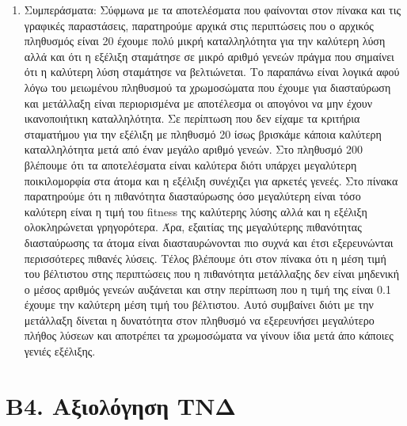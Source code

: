 \documentclass[12pt,a4paper]{article}
\newcommand{\tl}{\textlatin}
\begin{document}
\begin{enumerate}
\begin{figure}[H]
\begin{subfigure}[ht]{0.7\textwidth}
                         \caption*{Περίπτωση: 200, 0.1 ,0.01}
                     \end{subfigure}
                \end{figure} 
            \item Συμπεράσματα: 
                    Σύφμωνα με τα αποτελέσματα που φαίνονται στον πίνακα και τις γραφικές παραστάσεις, παρατηρούμε αρχικά
                    στις περιπτώσεις που ο αρχικός πληθυσμός είναι 20 έχουμε πολύ μικρή καταλληλότητα για την καλύτερη λύση αλλά και
                    ότι η εξέλιξη σταμάτησε σε μικρό αριθμό γενεών πράγμα που σημαίνει ότι η καλύτερη λύση σταμάτησε να βελτιώνεται.
                    Το παραπάνω είναι λογικά αφού λόγω του μειωμένου πληθυσμού τα χρωμοσώματα που έχουμε για διασταύρωση και 
                    μετάλλαξη είναι περιορισμένα με αποτέλεσμα οι απογόνοι να μην έχουν ικανοποιήτικη καταλληλότητα. Σε περίπτωση 
                    που δεν είχαμε τα κριτήρια σταματήμου για την εξέλιξη με πληθυσμό 20 ίσως βρισκάμε κάποια καλύτερη καταλληλότητα
                    μετά από έναν μεγάλο αριθμό γενεών. Στο πληθυσμό 200 βλέπουμε ότι τα αποτελέσματα είναι καλύτερα διότι υπάρχει 
                    μεγαλύτερη ποικιλομορφία στα άτομα και η εξέλιξη συνέχιζει για αρκετές γενεές.
                    Στο πίνακα παρατηρούμε ότι η πιθανότητα διασταύρωσης όσο μεγαλύτερη είναι τόσο καλύτερη είναι η τιμή του
                    \tl{fitness} της καλύτερης λύσης αλλά και η εξέλιξη ολοκληρώνεται γρηγορότερα. Άρα, εξαιτίας της μεγαλύτερης
                    πιθανότητας διασταύρωσης τα άτομα είναι διασταυρώνονται πιο συχνά και έτσι εξερευνώνται περισσότερες πιθανές 
                    λύσεις. Τέλος βλέπουμε ότι στον πίνακα ότι η μέση τιμή του βέλτιστου στης περιπτώσεις που η πιθανότητα
                    μετάλλαξης δεν είναι μηδενική ο μέσος αριθμός γενεών αυξάνεται και στην περίπτωση που η τιμή της είναι 0.1
                    έχουμε την καλύτερη μέση τιμή του βέλτιστου. Αυτό συμβαίνει διότι με την μετάλλαξη δίνεται η δυνατότητα στον
                    πληθυσμό να εξερευνήσει μεγαλύτερο πλήθος λύσεων και αποτρέπει τα χρωμοσώματα να γίνουν ίδια μετά άπο κάποιες
                    γενιές εξέλιξης.
        \end{enumerate}

        \section*{Β4. Αξιολόγηση ΤΝΔ}
\end{document}
